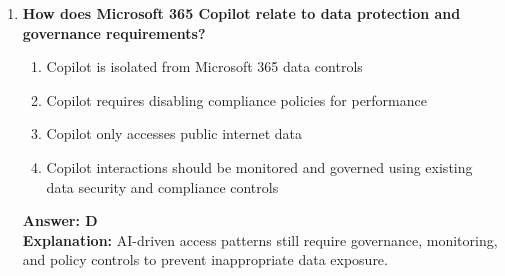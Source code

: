 \documentclass[10pt]{article}
\begin{document}
\begin{enumerate}[leftmargin=*]
\item \textbf{How does Microsoft 365 Copilot relate to data protection and governance requirements?}
\begin{enumerate}[label=\Alph*.]
  \item Copilot is isolated from Microsoft 365 data controls
  \item Copilot requires disabling compliance policies for performance
  \item Copilot only accesses public internet data
  \item Copilot interactions should be monitored and governed using existing data security and compliance controls
\end{enumerate}
\textbf{Answer: D}\\
\textbf{Explanation:} AI-driven access patterns still require governance, monitoring, and policy controls to prevent inappropriate data exposure.

\end{enumerate}
\clearpage
\end{document}
